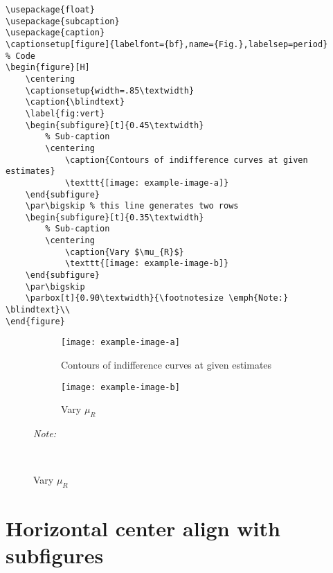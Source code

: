 \documentclass[12pt,english]{article}
\begin{document}
\begin{lstlisting}[frame=single]
% Included Package
\usepackage{float}
\usepackage{subcaption}
\usepackage{caption}
\captionsetup[figure]{labelfont={bf},name={Fig.},labelsep=period}
% Code
\begin{figure}[H]
    \centering
    \captionsetup{width=.85\textwidth}
	\caption{\blindtext}
	\label{fig:vert}
	\begin{subfigure}[t]{0.45\textwidth}
        % Sub-caption
        \centering
    		\caption{Contours of indifference curves at given estimates}
    		\texttt{[image: example-image-a]}
	\end{subfigure}
	\par\bigskip % this line generates two rows
	\begin{subfigure}[t]{0.35\textwidth}
	    % Sub-caption
	    \centering
    		\caption{Vary $\mu_{R}$}
    		\texttt{[image: example-image-b]}
	\end{subfigure}
	\par\bigskip
    \parbox[t]{0.90\textwidth}{\footnotesize \emph{Note:} \blindtext}\\
\end{figure}
\end{lstlisting}

\par\medskip
\begin{figure}[H]
    \centering
    \captionsetup{width=.85\textwidth}
	\caption{\blindtext}
	\label{fig:vert}
	\begin{subfigure}[t]{0.45\textwidth}
        \centering
    		\caption{Contours of indifference curves at given estimates}
    		\texttt{[image: example-image-a]}
	\end{subfigure}
	\par\bigskip %
	\begin{subfigure}[t]{0.35\textwidth}
	    \centering
    		\caption{Vary $\mu_{R}$}
    		\texttt{[image: example-image-b]}
	\end{subfigure}
	\par\bigskip
    \parbox[t]{0.90\textwidth}{\footnotesize \emph{Note:} \blindtext}\\
\end{figure}
\pagebreak

\section{Horizontal center align with subfigures}
\end{document}
